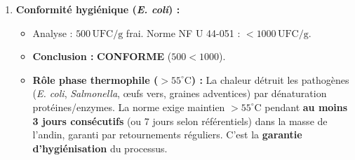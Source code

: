 \documentclass[11pt]{article}
\begin{document}
\begin{corrige}
\begin{enumerate}
\begin{enumerate}
\begin{itemize}
        \end{itemize}
        \item \textbf{Conformité hygiénique (\emph{E. coli}) :}
        \begin{itemize}
            \item Analyse : $500\,\text{UFC/g}$ frai. Norme NF U 44-051 : $< 1000\,\text{UFC/g}$.
            \item \textbf{Conclusion :} \textbf{CONFORME} ($500 < 1000$).
            \item \textbf{Rôle phase thermophile ($>55^\circ\text{C}$) :} La chaleur détruit les pathogènes (\emph{E. coli}, \emph{Salmonella}, œufs vers, graines adventices) par dénaturation protéines/enzymes. La norme exige maintien $>55^\circ\text{C}$ pendant \textbf{au moins 3 jours consécutifs} (ou 7 jours selon référentiels) dans la masse de l'andin, garanti par retournements réguliers. C'est la \textbf{garantie d'hygiénisation} du processus.
        \end{itemize}
    \end{enumerate}


\end{enumerate}
\end{corrige}
\end{document}
